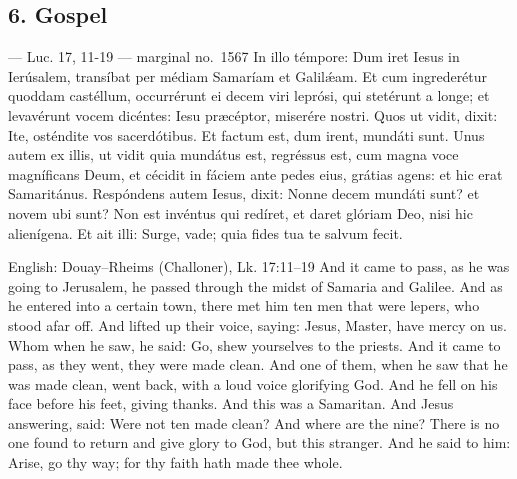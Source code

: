 
\elementguard
\subsection*{6. Gospel }

\begin{appointedlatin}{ --- Luc. 17, 11-19 --- marginal no.\ 1567}
In illo témpore: Dum iret Iesus in Ierúsalem, transíbat per médiam Samaríam et
Galilǽam. Et cum ingrederétur quoddam castéllum, occurrérunt ei decem viri
leprósi, qui stetérunt a longe; et levavérunt vocem dicéntes: Iesu præcéptor,
miserére nostri. Quos ut vidit, dixit: Ite, osténdite vos sacerdótibus. Et
factum est, dum irent, mundáti sunt. Unus autem ex illis, ut vidit quia
mundátus est, regréssus est, cum magna voce magníficans Deum, et cécidit in
fáciem ante pedes eius, grátias agens: et hic erat Samaritánus. Respóndens
autem Iesus, dixit: Nonne decem mundáti sunt? et novem ubi sunt? Non est
invéntus qui redíret, et daret glóriam Deo, nisi hic alienígena. Et ait illi:
Surge, vade; quia fides tua te salvum fecit.
\end{appointedlatin}

\begin{namedtranslation}{English: Douay--Rheims (Challoner), Lk. 17:11--19}
And it came to pass, as he was going to Jerusalem, he passed through the midst
of Samaria and Galilee. And as he entered into a certain town, there met him
ten men that were lepers, who stood afar off. And lifted up their voice,
saying: Jesus, Master, have mercy on us. Whom when he saw, he said: Go, shew
yourselves to the priests. And it came to pass, as they went, they were made
clean. And one of them, when he saw that he was made clean, went back, with a
loud voice glorifying God. And he fell on his face before his feet, giving
thanks. And this was a Samaritan. And Jesus answering, said: Were not ten made
clean? And where are the nine? There is no one found to return and give glory
to God, but this stranger. And he said to him: Arise, go thy way; for thy
faith hath made thee whole.
\end{namedtranslation}

